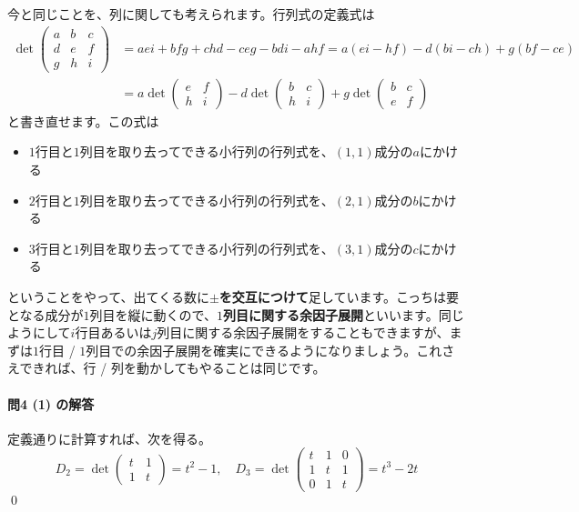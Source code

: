 今と同じことを、列に関しても考えられます。行列式の定義式は
\begin{align*}
\det
\begin{pmatrix}
a & b & c \\
d & e & f \\
g & h & i
\end{pmatrix}
&=  aei + bfg + chd - ceg - bdi - ahf
= a(ei - hf) - d(bi - ch) + g(bf - ce) \\
&=
a \det
\begin{pmatrix}
e & f \\
h & i
\end{pmatrix}
- d \det
\begin{pmatrix}
b & c \\
h & i
\end{pmatrix}
+ g \det
\begin{pmatrix}
b & c \\
e & f
\end{pmatrix}
\end{align*}
と書き直せます。この式は
\begin{itemize}
\item \uline{$1$}行目と\uline{$1$}列目を取り去ってできる小行列の行列式を、\uline{$(1, 1)$}成分の$a$にかける
\item \uline{$2$}行目と\uline{$1$}列目を取り去ってできる小行列の行列式を、\uline{$(2, 1)$}成分の$b$にかける
\item \uline{$3$}行目と\uline{$1$}列目を取り去ってできる小行列の行列式を、\uline{$(3, 1)$}成分の$c$にかける
\end{itemize}
ということをやって、出てくる数に\textbf{$\pm$を交互につけて}足しています。こっちは要となる成分が$1$列目を縦に動くので、\textbf{$1$列目に関する余因子展開}といいます。同じようにして$i$行目あるいは$j$列目に関する余因子展開をすることもできますが、まずは$1$行目 / $1$列目での余因子展開を確実にできるようになりましょう。これさえできれば、行 / 列を動かしてもやることは同じです。

\paragraph{問4 (1) の解答} 定義通りに計算すれば、次を得る。
\[
D_2 = \det
\begin{pmatrix}
t & 1 \\
1 & t
\end{pmatrix}
= t^2 - 1, \quad
D_3 = \det
\begin{pmatrix}
t & 1 & 0 \\
1 & t & 1 \\
0 & 1 & t
\end{pmatrix}
= t^3 - 2t
\]
\qed

